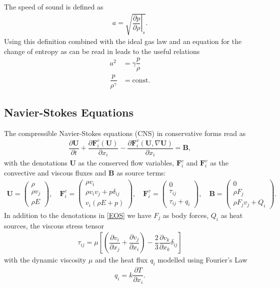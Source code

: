 		The speed of sound is defined as 
		\begin{align}
			a = \sqrt{\left.\dfrac{\partial p}{\partial \rho}\right|_s}.
		\end{align}
		Using this definition combined with the ideal gas law and an equation for the change of entropy as can be read in \cite{mueller2014} leads to the useful relations
		\begin{align}
			a^2 &= \gamma \dfrac{p}{\rho}\\
			\dfrac{p}{\rho^\gamma} &= \text{const}.
		\end{align}
		
		
		\subsection{Navier-Stokes Equations}
		The compressible Navier-Stokes equations (CNS) in conservative forms read as 
		\begin{align}
			\dfrac{\partial \mathbf{U}}{\partial t} + \dfrac{\partial \mathbf{F}_i^c(\mathbf{U})}{\partial x_i} - \dfrac{\partial \mathbf{F}_i^v(\mathbf{U}, \nabla\mathbf{U})}{\partial x_i} = \mathbf{B},
		\end{align}
		with the denotations $\mathbf{U}$ as the conserved flow variables, $\mathbf{F}_i^c$ and $\mathbf{F}_i^v$ as the convective and viscous fluxes and $\mathbf{B}$ as source terms:
		\begin{align}
			\mathbf{U} = 
				\begin{pmatrix}
				\rho \\
				\rho v_j \\
				\rho E
				\end{pmatrix} , \quad
			\mathbf{F}_i^c = 
				\begin{pmatrix}
				\rho v_i \\
				\rho v_i v_j + p \delta_{ij}\\
				v_i(\rho E + p)
				\end{pmatrix} , \quad
			\mathbf{F}_i^v = 
				\begin{pmatrix}
				0 \\
				\tau_{ij}\\
				\tau_{ij} + q_i
				\end{pmatrix} , \quad
			\mathbf{B} = 
				\begin{pmatrix}
				0 \\
				\rho F_j\\
				\rho F_j v_j + Q_i
				\end{pmatrix}.
		\end{align}
		In addition to the denotations in \ref{EOS} we have $F_j$ as body forces, $Q_i$ as heat sources, the viscous stress tensor
		\begin{align}
			\tau_{ij} = \mu \left[\left(\dfrac{\partial v_i}{\partial x_j} + \dfrac{\partial v_j}{\partial x_i} \right) - \dfrac{2}{3} \dfrac{\partial v_k}{\partial x_k} \delta_{ij}\right]
		\end{align}
		with the dynamic viscosity $\mu$ and the heat flux $q_i$ modelled using Fourier's Law
		\begin{align}
			q_i = k \dfrac{\partial T}{\partial x_i}.
		\end{align}
		
